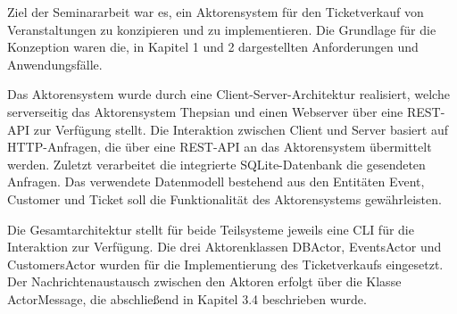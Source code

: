 Ziel der Seminararbeit war es, ein Aktorensystem für den Ticketverkauf von Veranstaltungen zu konzipieren und zu implementieren. 
Die Grundlage für die Konzeption waren die, in Kapitel 1 und 2 dargestellten Anforderungen und Anwendungsfälle. 

Das Aktorensystem wurde durch eine Client-Server-Architektur realisiert, welche serverseitig das Aktorensystem Thepsian und einen Webserver über eine REST-API zur Verfügung stellt. 
Die Interaktion zwischen Client und Server basiert auf HTTP-Anfragen, die über eine REST-API an das Aktorensystem übermittelt werden. 
Zuletzt verarbeitet die integrierte SQLite-Datenbank die gesendeten Anfragen. 
Das verwendete Datenmodell bestehend aus den Entitäten Event, Customer und Ticket soll die Funktionalität des Aktorensystems gewährleisten.

Die Gesamtarchitektur stellt für beide Teilsysteme jeweils eine CLI für die Interaktion zur Verfügung. 
Die drei Aktorenklassen DBActor, EventsActor und CustomersActor wurden für die Implementierung des Ticketverkaufs eingesetzt. 
Der Nachrichtenaustausch zwischen den Aktoren erfolgt über die Klasse ActorMessage, die abschließend in Kapitel 3.4 beschrieben wurde.
